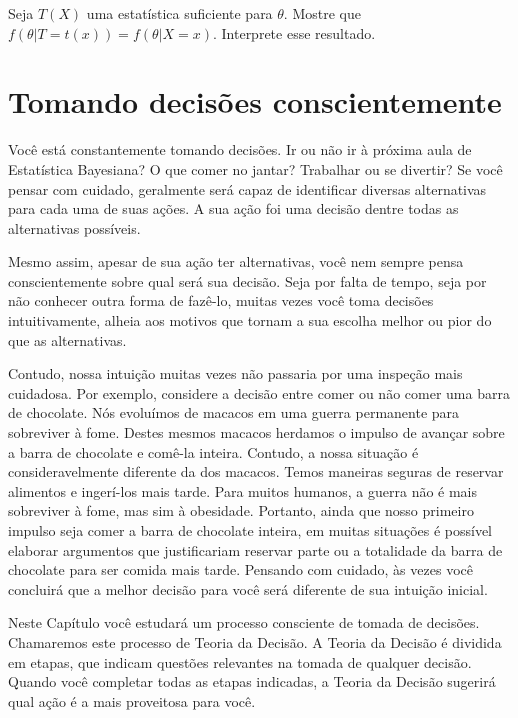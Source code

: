 \begin{exercise}
Seja $T(X)$ uma estatística suficiente para $\theta$. Mostre que 
$f(\theta|T=t(x))=f(\theta|X=x)$. Interprete esse resultado.
\end{exercise}


\section{Tomando decisões conscientemente}
\label{section:decisions}

Você está constantemente tomando decisões.
Ir ou não ir à próxima aula de Estatística Bayesiana?
O que comer no jantar?
Trabalhar ou se divertir?
Se você pensar com cuidado, 
geralmente será capaz de identificar
diversas alternativas para cada uma
de suas ações.
A sua ação foi uma decisão
dentre todas as alternativas possíveis.

Mesmo assim, apesar de sua ação ter alternativas,
você nem sempre pensa conscientemente sobre
qual será sua decisão.
Seja por falta de tempo,
seja por não conhecer outra forma de fazê-lo,
muitas vezes você toma decisões intuitivamente,
alheia aos motivos que tornam a sua escolha
melhor ou pior do que as alternativas.

Contudo, nossa intuição
muitas vezes não passaria por
uma inspeção mais cuidadosa.
Por exemplo, considere a decisão entre
comer ou não comer uma barra de chocolate.
Nós evoluímos de macacos
em uma guerra permanente para sobreviver à fome.
Destes mesmos macacos 
herdamos o impulso de avançar sobre
a barra de chocolate e comê-la inteira.
Contudo, a nossa situação é consideravelmente
diferente da dos macacos.
Temos maneiras seguras de reservar alimentos
e ingerí-los mais tarde.
Para muitos humanos,
a guerra não é mais sobreviver à fome,
mas sim à obesidade.
Portanto, ainda que nosso primeiro impulso seja
comer a barra de chocolate inteira,
em muitas situações é possível elaborar argumentos
que justificariam reservar parte ou a totalidade da
barra de chocolate para ser comida mais tarde.
Pensando com cuidado, 
às vezes você concluirá que a melhor decisão para você
será diferente de sua intuição inicial.

Neste Capítulo você estudará um processo consciente
de tomada de decisões.
Chamaremos este processo de Teoria da Decisão.
A Teoria da Decisão é dividida em etapas,
que indicam questões relevantes na tomada de qualquer decisão.
Quando você completar todas as etapas indicadas,
a Teoria da Decisão sugerirá
qual ação é a mais proveitosa para você.

